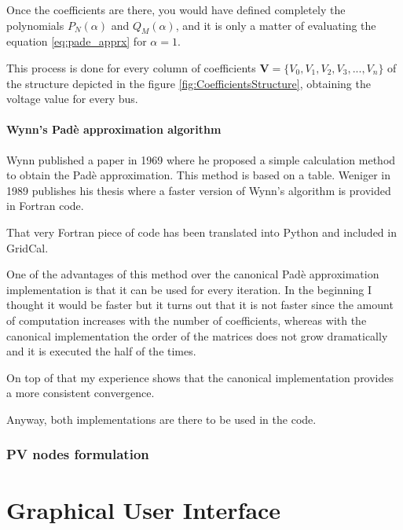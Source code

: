 \documentclass[11pt,fleqn]{book} %
\begin{document}
Once the coefficients are there, you would have defined completely the polynomials $P_N(\alpha)$ and $Q_M(\alpha)$, and it is only a matter of evaluating the equation \ref{eq:pade_apprx} for $\alpha=1$.\newline


This process is done for every column of coefficients $\textbf{V}=\{V_0, V_1,V_2,V_3, ...,V_n\}$ of the structure depicted in the figure \ref{fig:CoefficientsStructure}, obtaining the voltage value for every bus.

\subsubsection{Wynn's Padè approximation algorithm}

Wynn published a paper in 1969 where he proposed a simple calculation method to obtain the Padè approximation. This method is based on a table. Weniger in 1989 publishes his thesis where a faster version of Wynn's algorithm is provided in Fortran code. 

That very Fortran piece of code has been translated into Python and included in GridCal.

One of the advantages of this method over the canonical Padè approximation implementation is that it can be used for every iteration. In the beginning I thought it would be faster but it turns out that it is not faster since the amount of computation increases with the number of coefficients, whereas with the canonical implementation the order of the matrices does not grow dramatically and it is executed the half of the times.

On top of that my experience shows that the canonical implementation provides a more consistent convergence.

Anyway, both implementations are there to be used in the code.


\subsection{PV nodes formulation}


\chapter{Graphical User Interface}



\end{document}
